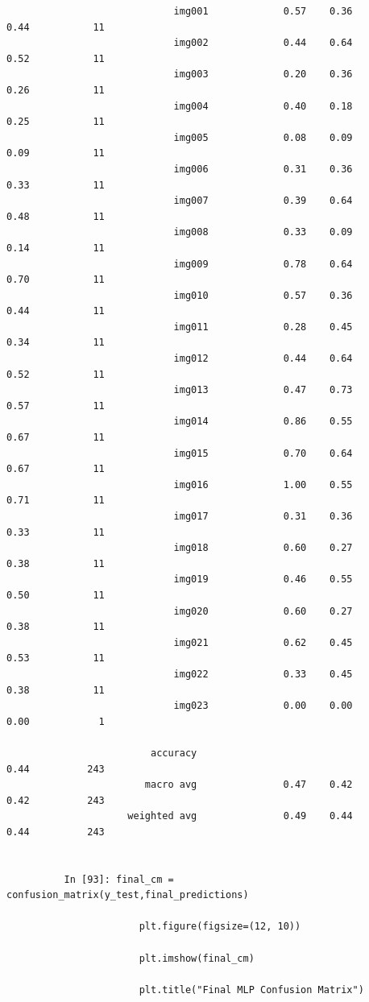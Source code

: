 \documentclass[12pt,a4paper]{article}
\begin{document}
\begin{lstlisting}
                             img001             0.57    0.36       0.44           11
                             img002             0.44    0.64       0.52           11
                             img003             0.20    0.36       0.26           11
                             img004             0.40    0.18       0.25           11
                             img005             0.08    0.09       0.09           11
                             img006             0.31    0.36       0.33           11
                             img007             0.39    0.64       0.48           11
                             img008             0.33    0.09       0.14           11
                             img009             0.78    0.64       0.70           11
                             img010             0.57    0.36       0.44           11
                             img011             0.28    0.45       0.34           11
                             img012             0.44    0.64       0.52           11
                             img013             0.47    0.73       0.57           11
                             img014             0.86    0.55       0.67           11
                             img015             0.70    0.64       0.67           11
                             img016             1.00    0.55       0.71           11
                             img017             0.31    0.36       0.33           11
                             img018             0.60    0.27       0.38           11
                             img019             0.46    0.55       0.50           11
                             img020             0.60    0.27       0.38           11
                             img021             0.62    0.45       0.53           11
                             img022             0.33    0.45       0.38           11
                             img023             0.00    0.00       0.00            1

                         accuracy                                  0.44          243
                        macro avg               0.47    0.42       0.42          243
                     weighted avg               0.49    0.44       0.44          243


          In [93]: final_cm = confusion_matrix(y_test,final_predictions)

                       plt.figure(figsize=(12, 10))

                       plt.imshow(final_cm)

                       plt.title("Final MLP Confusion Matrix")


\end{lstlisting}
\end{document}
